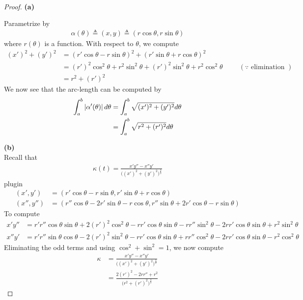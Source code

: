 \documentclass{report}
\begin{document}
\begin{proof}
\textbf{(a)}

Parametrize by 
\begin{align*}
  \alpha (\theta)\triangleq (x,y)\triangleq (r \cos \theta, r \sin \theta)
\end{align*}
where $r(\theta)$ is a function. With respect to $\theta$, we compute 
\begin{align*}
  (x')^2+(y')^2&=(r'\cos \theta-r\sin \theta)^2+(r' \sin \theta + r \cos \theta)^2\\
  &=(r')^2 \cos ^2 \theta + r^2 \sin ^2 \theta + (r')^2 \sin ^2 \theta + r^2 \cos ^2 \theta \hspace{1cm}(\because \text{ elimination })\\
  &=r^2+(r')^2 
\end{align*}
We now see that the arc-length can be computed by 
\begin{align*}
\int_a^b \left|\alpha '(\theta)\right|d\theta&= \int_a^b \sqrt{(x')^2+(y')^2}d\theta \\
&=\int_a^b \sqrt{r^2 +(r')^2}d\theta 
\end{align*}

\textbf{(b)}\\

Recall that 
\begin{align*}
\kappa(t) = \frac{x'y''-x''y'}{\big((x')^2 + (y')^2 \big)^{\frac{3}{2}}}
\end{align*}
plugin 
\begin{align*}
  (x',y')&=(r'\cos \theta -r \sin \theta, r' \sin \theta + r \cos \theta)\\
  (x'',y'')&=(r''\cos \theta -2r' \sin \theta -r\cos \theta, r'' \sin \theta + 2r' \cos \theta  -r \sin \theta)
\end{align*}
To compute 
\begin{align*}
x'y''&= r'r''\cos \theta \sin \theta + 2(r')^2 \cos ^2 \theta -rr'\cos \theta \sin \theta -r r'' \sin ^2 \theta -2rr' \cos \theta \sin \theta +r^2 \sin ^2 \theta\\
x''y'&=r'r''\sin \theta \cos \theta - 2(r')^2 \sin ^2 \theta -rr' \cos \theta \sin \theta +rr'' \cos ^2 \theta - 2rr' \cos \theta \sin \theta  -r^2 \cos ^2 \theta
\end{align*}
Eliminating the odd terms and using $\cos^2+\sin^2=1$, we now compute 
\begin{align*}
\kappa&=\frac{x'y''-x''y'}{\big((x')^2 +(y')^2\big)^{\frac{3}{2}}}\\
&=\frac{2(r')^2-2rr''+r^2}{\big(r^2+(r')^2 \big)^{\frac{3}{2}}}
\end{align*}
\end{proof}
\end{document}
